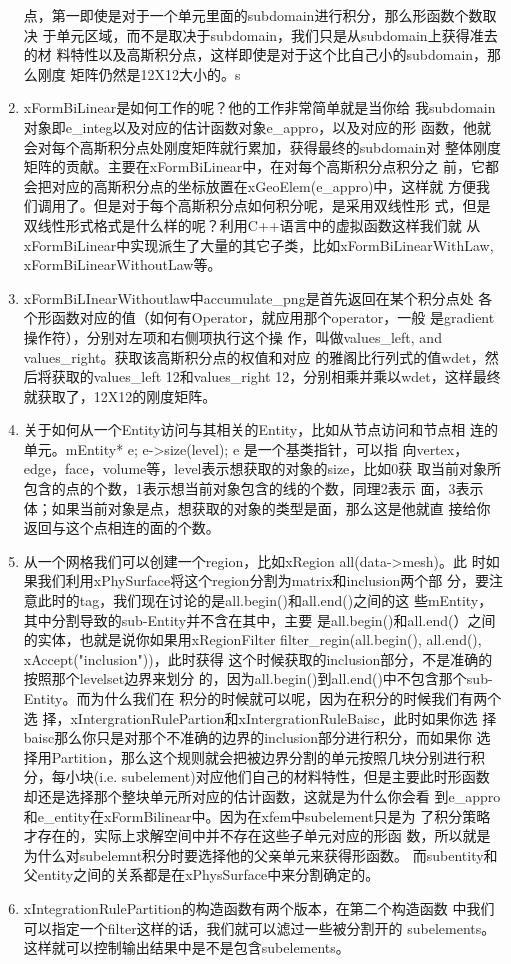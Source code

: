 \documentclass{article}
\begin{document}
\begin{enumerate}
  点，第一即使是对于一个单元里面的subdomain进行积分，那么形函数个数取决
  于单元区域，而不是取决于subdomain，我们只是从subdomain上获得准去的材
  料特性以及高斯积分点，这样即使是对于这个比自己小的subdomain，那么刚度
  矩阵仍然是12X12大小的。s
\item xFormBiLinear是如何工作的呢？他的工作非常简单就是当你给
  我subdomain对象即e\_integ以及对应的估计函数对象e\_appro，以及对应的形
  函数，他就会对每个高斯积分点处刚度矩阵就行累加，获得最终的subdomain对
  整体刚度矩阵的贡献。主要在xFormBiLinear中，在对每个高斯积分点积分之
  前，它都会把对应的高斯积分点的坐标放置在xGeoElem(e\_appro)中，这样就
  方便我们调用了。但是对于每个高斯积分点如何积分呢，是采用双线性形
  式，但是双线性形式格式是什么样的呢？利用C++语言中的虚拟函数这样我们就
  从xFormBiLinear中实现派生了大量的其它子类，比如xFormBiLinearWithLaw,
  xFormBiLinearWithoutLaw等。
\item xFormBiLInearWithoutlaw中accumulate\_png是首先返回在某个积分点处
  各个形函数对应的值（如何有Operator，就应用那个operator，一般
  是gradient操作符），分别对左项和右侧项执行这个操
  作，叫做values\_left, and values\_right。获取该高斯积分点的权值和对应
  的雅阁比行列式的值wdet，然后将获取的values\_left 12和values\_right
  12，分别相乘并乘以wdet，这样最终就获取了，12X12的刚度矩阵。
\item 关于如何从一个Entity访问与其相关的Entity，比如从节点访问和节点相
  连的单元。mEntity{*} e; e->size(level); e 是一个基类指针，可以指
  向vertex，edge，face，volume等，level表示想获取的对象的size，比如0获
  取当前对象所包含的点的个数，1表示想当前对象包含的线的个数，同理2表示
  面，3表示体；如果当前对象是点，想获取的对象的类型是面，那么这是他就直
  接给你返回与这个点相连的面的个数。

\item 从一个网格我们可以创建一个region，比如xRegion all(data->mesh)。此
  时如果我们利用xPhySurface将这个region分割为matrix和inclusion两个部
  分，要注意此时的tag，我们现在讨论的是all.begin()和all.end()之间的这
  些mEntity，其中分割导致的sub-Entity并不含在其中，主要
  是all.begin()和all.end(）之间的实体，也就是说你如果用xRegionFilter
  filter\_regin(all.begin(), all.end(), xAccept("inclusion"))，此时获得
  这个时候获取的inclusion部分，不是准确的按照那个levelset边界来划分
  的，因为all.begin()到all.end()中不包含那个sub-Entity。而为什么我们在
  积分的时候就可以呢，因为在积分的时候我们有两个选
  择，xIntergrationRulePartion和xIntergrationRuleBaisc，此时如果你选
  择baisc那么你只是对那个不准确的边界的inclusion部分进行积分，而如果你
  选择用Partition，那么这个规则就会把被边界分割的单元按照几块分别进行积
  分，每小块(i.e. subelement)对应他们自己的材料特性，但是主要此时形函数
  却还是选择那个整块单元所对应的估计函数，这就是为什么你会看
  到e\_appro和e\_entity在xFormBilinear中。因为在xfem中subelement只是为
  了积分策略才存在的，实际上求解空间中并不存在这些子单元对应的形函
  数，所以就是为什么对subelemnt积分时要选择他的父亲单元来获得形函数。
  而subentity和父entity之间的关系都是在xPhysSurface中来分割确定的。
\item xIntegrationRulePartition的构造函数有两个版本，在第二个构造函数
  中我们可以指定一个filter这样的话，我们就可以滤过一些被分割开的
  subelements。这样就可以控制输出结果中是不是包含subelements。


\end{enumerate}
\end{document}
